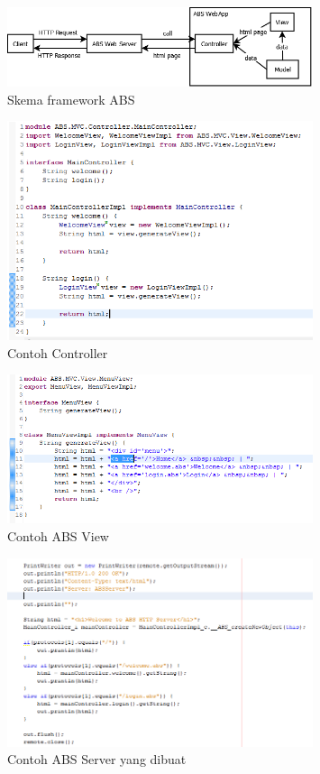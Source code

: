 \begin{figure}
    \centering
    \includegraphics[width=0.8\textwidth]
        {img/abs-mvc.png}
    \caption{Skema framework ABS}
\end{figure}

\begin{figure}
    \centering
    \includegraphics[width=0.8\textwidth]
        {img/controller-eksperimen.png}
    \caption{Contoh Controller}
\end{figure}

\begin{figure}
    \centering
    \includegraphics[width=0.8\textwidth]
        {img/view-eksperimen.png}
    \caption{Contoh ABS View}
\end{figure}

\begin{figure}
    \centering
    \includegraphics[width=0.8\textwidth]
        {img/server-eksperimen.png}
    \caption{Contoh ABS Server yang dibuat}
\end{figure}

